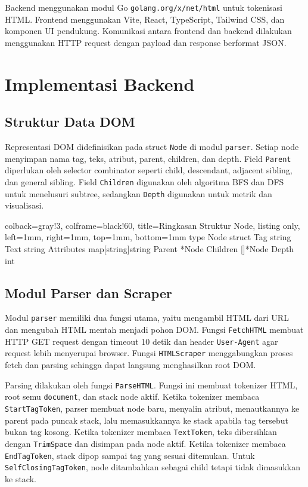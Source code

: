 Backend menggunakan modul Go \texttt{golang.org/x/net/html} untuk tokenisasi HTML. Frontend menggunakan Vite, React, TypeScript, Tailwind CSS, dan komponen UI pendukung. Komunikasi antara frontend dan backend dilakukan menggunakan HTTP request dengan payload dan response berformat JSON.

\section{Implementasi Backend}

\subsection{Struktur Data DOM}

Representasi DOM didefinisikan pada struct \texttt{Node} di modul \texttt{parser}. Setiap node menyimpan nama tag, teks, atribut, parent, children, dan depth. Field \texttt{Parent} diperlukan oleh selector combinator seperti child, descendant, adjacent sibling, dan general sibling. Field \texttt{Children} digunakan oleh algoritma BFS dan DFS untuk menelusuri subtree, sedangkan \texttt{Depth} digunakan untuk metrik dan visualisasi.

\begin{tcblisting}{
        colback=gray!3,
        colframe=black!60,
        title=Ringkasan Struktur Node,
        listing only,
        left=1mm,
        right=1mm,
        top=1mm,
        bottom=1mm
    }
    type Node struct {
        Tag        string
        Text       string
        Attributes map[string]string
        Parent     *Node
        Children   []*Node
        Depth      int
    }
\end{tcblisting}

\subsection{Modul Parser dan Scraper}

Modul \texttt{parser} memiliki dua fungsi utama, yaitu mengambil HTML dari URL dan mengubah HTML mentah menjadi pohon DOM. Fungsi \texttt{FetchHTML} membuat HTTP GET request dengan timeout 10 detik dan header \texttt{User-Agent} agar request lebih menyerupai browser. Fungsi \texttt{HTMLScraper} menggabungkan proses fetch dan parsing sehingga dapat langsung menghasilkan root DOM.

Parsing dilakukan oleh fungsi \texttt{ParseHTML}. Fungsi ini membuat tokenizer HTML, root semu \texttt{document}, dan stack node aktif. Ketika tokenizer membaca \texttt{StartTagToken}, parser membuat node baru, menyalin atribut, menautkannya ke parent pada puncak stack, lalu memasukkannya ke stack apabila tag tersebut bukan tag kosong. Ketika tokenizer membaca \texttt{TextToken}, teks dibersihkan dengan \texttt{TrimSpace} dan disimpan pada node aktif. Ketika tokenizer membaca \texttt{EndTagToken}, stack dipop sampai tag yang sesuai ditemukan. Untuk \texttt{SelfClosingTagToken}, node ditambahkan sebagai child tetapi tidak dimasukkan ke stack.

